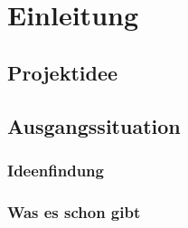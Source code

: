 \chapter{Einleitung}

\renewcommand{\kapitelautor}{}

\section{Projektidee}

\section{Ausgangssituation}

\subsection{Ideenfindung}

\subsection{Was es schon gibt}
